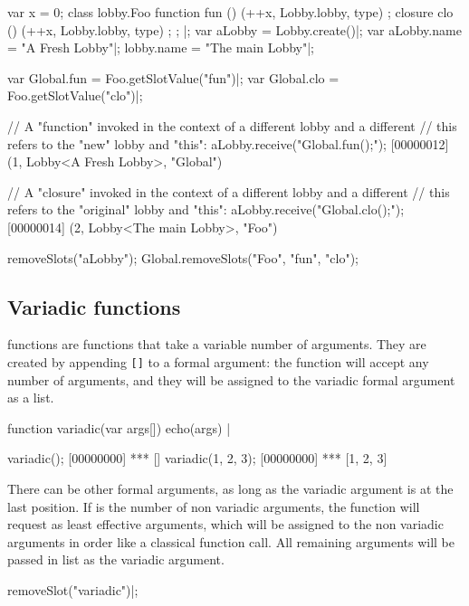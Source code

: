 \begin{urbiscript}
{
  var x = 0;
  class lobby.Foo
  {
    function fun () { (++x, Lobby.lobby, type) };
    closure  clo () { (++x, Lobby.lobby, type) };
  };
}|;
var aLobby = Lobby.create()|;
var aLobby.name = "A Fresh Lobby"|;
lobby.name = "The main Lobby"|;

var Global.fun = Foo.getSlotValue("fun")|;
var Global.clo = Foo.getSlotValue("clo")|;

// A "function" invoked in the context of a different lobby and a different
// this refers to the "new" lobby and "this":
aLobby.receive("Global.fun();");
[00000012] (1, Lobby<A Fresh Lobby>, "Global")

// A "closure" invoked in the context of a different lobby and a different
// this refers to the "original" lobby and "this":
aLobby.receive("Global.clo();");
[00000014] (2, Lobby<The main Lobby>, "Foo")
\end{urbiscript}
\begin{urbicomment}
removeSlots("aLobby");
Global.removeSlots("Foo", "fun", "clo");
\end{urbicomment}


\subsection{Variadic functions}
\label{sec:lang:fun-variadic}

 functions are functions that take a variable number of
arguments. They are created by appending \lstinline|[]| to a formal
argument: the function will accept any number of arguments, and they will be
assigned to the variadic formal argument as a list.

\begin{urbiscript}
function variadic(var args[])
{
  echo(args)
} |

variadic();
[00000000] *** []
variadic(1, 2, 3);
[00000000] *** [1, 2, 3]
\end{urbiscript}

There can be other formal arguments, as long as the variadic argument is at
the last position. If  is the number of non variadic arguments, the
function will request as least  effective arguments, which will be
assigned to the non variadic arguments in order like a classical function
call. All remaining arguments will be passed in list as the variadic
argument.

\begin{urbicomment}
removeSlot("variadic")|;
\end{urbicomment}

